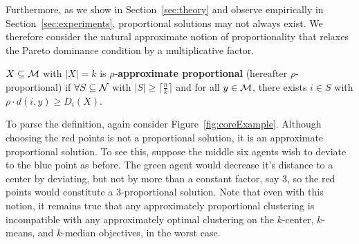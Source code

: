 Furthermore, as we show in Section~\ref{sec:theory} and observe empirically in Section~\ref{sec:experiments}, proportional solutions may not always exist. We therefore consider the natural approximate notion of proportionality that relaxes the Pareto dominance condition by a multiplicative factor.

\begin{definition}
	$X \subseteq \mathcal{M}$ with $|X| = k$ is $\rho$-\textbf{approximate proportional} (hereafter $\rho$-proportional) if $\forall S \subseteq \mathcal {N}$ with $|S| \geq \lceil \frac{n}{k} \rceil$ and for all $y \in \mathcal{M}$, there exists $i \in S$ with $\rho \cdot d(i, y) \geq D_i(X)$.
\end{definition}

To parse the definition, again consider Figure~\ref{fig:coreExample}. Although choosing the red points is not a proportional solution, it is an approximate proportional solution. To see this, suppose the middle six agents wish to deviate to the blue point as before. The green agent would decrease it's distance to a center by deviating, but not by more than a constant factor, say $3$, so the red points would constitute a 3-proportional solution. Note that even with this notion, it remains true that any approximately proportional clustering is incompatible with any approximately optimal clustering on the $k$-center, $k$-means, and $k$-median objectives, in the worst case.

